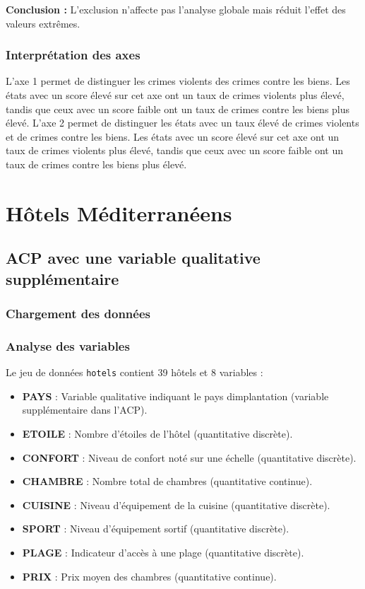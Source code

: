 \documentclass{article}
\begin{document}
    \textbf{Conclusion :} L’exclusion n’affecte pas l’analyse globale mais réduit l’effet des valeurs extrêmes.

    \subsubsection{Interprétation des axes}
    L'axe 1 permet de distinguer les crimes violents des crimes contre les biens. Les états avec un score élevé sur cet axe ont un taux de crimes violents plus élevé, tandis que ceux avec un score faible ont un taux de crimes contre les biens plus élevé.
    L'axe 2 permet de distinguer les états avec un taux élevé de crimes violents et de crimes contre les biens. Les états avec un score élevé sur cet axe ont un taux de crimes violents plus élevé, tandis que ceux avec un score faible ont un taux de crimes contre les biens plus élevé.

    \section{Hôtels Méditerranéens}

    \subsection{ACP avec une variable qualitative supplémentaire}

    \subsubsection{Chargement des données}

    \subsubsection{Analyse des variables}

    Le jeu de données \texttt{hotels} contient 39 hôtels et 8 variables :

    \begin{itemize}
        \item \textbf{PAYS} : Variable qualitative indiquant le pays dimplantation (variable supplémentaire dans l'ACP).
        \item \textbf{ETOILE} : Nombre d’étoiles de l’hôtel (quantitative discrète).
        \item \textbf{CONFORT} : Niveau de confort noté sur une échelle (quantitative discrète).
        \item \textbf{CHAMBRE} : Nombre total de chambres (quantitative continue).
        \item \textbf{CUISINE} : Niveau d’équipement de la cuisine (quantitative discrète).
        \item \textbf{SPORT} : Niveau d’équipement sortif (quantitative discrète).
        \item \textbf{PLAGE} : Indicateur d’accès à une plage (quantitative discrète).
        \item \textbf{PRIX} : Prix moyen des chambres (quantitative continue).
    \end{itemize}
\end{document}
